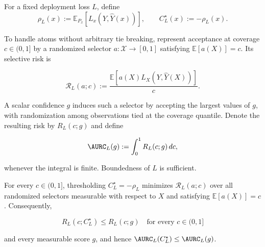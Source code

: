 \begin{definition}
\label{app:def:ideal-confidence}
For a fixed deployment loss $L$, define
\begin{equation}
  \rho_L(x)
  :=\mathbb{E}_{P_x}\!\left[L_x(Y,\widehat Y(x))\right],
  \qquad
  C_L^\star(x):=-\rho_L(x).
  \label{app:eq:ideal-confidence}
\end{equation}
\end{definition}

To handle atoms without arbitrary tie breaking, represent acceptance at
coverage $c\in(0,1]$ by a randomized selector
$a:\mathcal{X}\to[0,1]$ satisfying $\mathbb{E}[a(X)]=c$.  Its selective
risk is

\begin{equation}
  \mathcal{R}_L(a;c)
  :=\frac{\mathbb{E}\!\left[
      a(X)L_X(Y,\widehat Y(X))\right]}{c}.
  \label{app:eq:selector-risk}
\end{equation}

A scalar confidence $g$ induces such a selector by accepting the largest
values of $g$, with randomization among observations tied at the coverage
quantile.  Denote the resulting risk by $R_L(c;g)$ and define

\begin{equation}
  \AURC_L(g):=\int_0^1 R_L(c;g)\,dc,
  \label{app:eq:loss-aurc}
\end{equation}

whenever the integral is finite.  Boundedness of $L$ is sufficient.

\begin{proposition}
\label{app:prop:optimal-ranking}
For every $c\in(0,1]$, thresholding $C_L^\star=-\rho_L$ minimizes
$\mathcal{R}_L(a;c)$ over all randomized selectors measurable with
respect to $X$ and satisfying $\mathbb{E}[a(X)]=c$.  Consequently,

\begin{equation}
  R_L(c;C_L^\star)\leq R_L(c;g)
  \quad\text{for every }c\in(0,1]
\end{equation}

and every measurable score $g$, and hence
$\AURC_L(C_L^\star)\leq\AURC_L(g)$.
\end{proposition}

